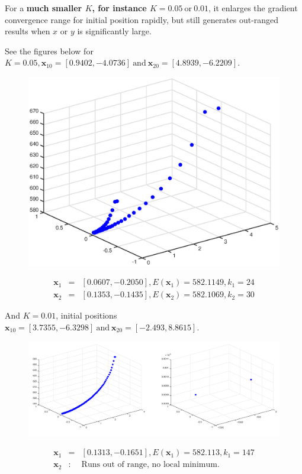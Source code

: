 \documentclass{article}
\begin{document}
\vspace{2mm}
\noindent
For a \textbf{much smaller $K$, for instance $K = 0.05~\text{or} ~0.01$}, it enlarges the gradient convergence range for initial position rapidly, but still generates out-ranged results when $x$ or $y$ is significantly large. 

\noindent
See the figures below for $K = 0.05, \mathbf{x}_{10} = [0.9402,-4.0736]~\text{and}~\mathbf{x}_{20} = [4.8939,-6.2209]$.
\begin{figure}[h]
    \centering
    \includegraphics[scale=0.46]{14}
\end{figure}
\begin{eqnarray*}
\mathbf{x}_{1} &=& [0.0607,-0.2050], E(\mathbf{x}_1) = 582.1149, k_1 = 24\\
\mathbf{x}_{2} &=& [0.1353,-0.1435], E(\mathbf{x}_2) = 582.1069, k_2 = 30
\end{eqnarray*}

And $K = 0.01$, initial positions $\mathbf{x}_{10} = [3.7355,-6.3298]~\text{and}~\mathbf{x}_{20} = [-2.493,8.8615]$.

\begin{figure}[h]
    \centering
    \includegraphics[scale=0.42]{15.jpg}
\end{figure}
\newpage
\begin{eqnarray*}
\mathbf{x}_{1} &=& [0.1313,-0.1651], E(\mathbf{x}_1) = 582.113, k_1 = 147\\
\mathbf{x}_{2} &:& \text{Runs out of range, no local minimum}.
\end{eqnarray*}
\end{document}
